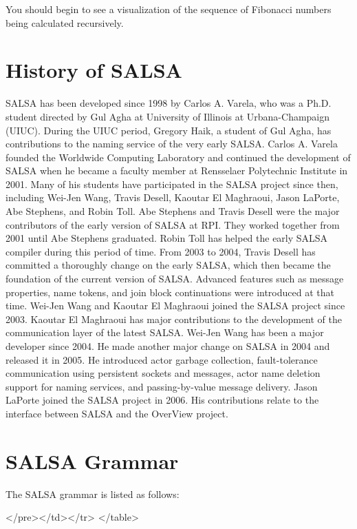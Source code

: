 You should begin to see a visualization of the sequence of Fibonacci numbers being calculated recursively.

\chapter{History of SALSA}
SALSA has been developed since 1998 by Carlos A. Varela, who was a Ph.D. student directed by Gul Agha at
University of Illinois at Urbana-Champaign (UIUC). During the UIUC period, Gregory Haik, a student of Gul Agha, 
has contributions to the naming service of the very early SALSA. 
Carlos A. Varela founded the Worldwide Computing Laboratory and continued the development of SALSA
when he became a faculty member at Rensselaer Polytechnic Institute in 2001.
Many of his students have participated in the SALSA project since then,
including Wei-Jen Wang,
Travis Desell, Kaoutar El Maghraoui, Jason LaPorte,
Abe Stephens, and Robin Toll.
Abe Stephens and Travis Desell were the major contributors of the early version of SALSA at RPI.
They worked together from 2001 until Abe Stephens graduated. Robin Toll has helped 
the early SALSA compiler during this period of time.
From 2003 to 2004, Travis Desell has committed a thoroughly change on the early SALSA, which then became the
foundation of the current version of SALSA. Advanced features such as message properties, 
name tokens, and join block continuations were introduced at that time. 
Wei-Jen Wang and Kaoutar El Maghraoui joined the SALSA project since 2003.
Kaoutar El Maghraoui has major contributions to the development of the communication layer of 
the latest SALSA.
Wei-Jen Wang has been a major developer since 2004. 
He made another major change on SALSA in 2004 and released it in 2005. 
He introduced actor garbage collection,
fault-tolerance communication using persistent sockets and messages, 
actor name deletion support for naming services, and passing-by-value message delivery.      
Jason LaPorte joined the SALSA project in 2006. His contributions relate to  
the interface between SALSA and the OverView project.   

\chapter{SALSA Grammar}\label{GRAMMAR}{
The SALSA grammar is listed as follows:
{\singlespace

}
\begin{htmlonly}

 \begin{rawhtml} 
   </pre></td></tr>
  </table>
\end{rawhtml} 
\end{htmlonly}

}
